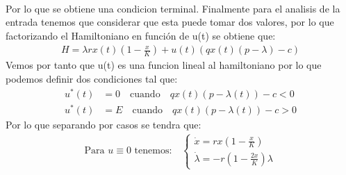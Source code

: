 \begin{itemize}
\begin{align}
\end{align}
Por lo que se obtiene una condicion terminal. Finalmente para el analisis de la entrada tenemos que considerar que esta puede tomar dos valores, por lo que factorizando el Hamiltoniano en función de u(t) se obtiene que:
\begin{align}
    H = \lambda r x(t) \left( 1 - \frac{x}{K} \right) + u(t) \left( q x(t) (p - \lambda) - c \right)
\end{align}
Vemos por tanto que u(t) es una funcion lineal al hamiltoniano por lo que podemos definir dos condiciones tal que:
\begin{align*}
    u^*(t) &= 0 \quad \text{cuando} \quad q x(t) (p - \lambda(t)) - c < 0 \\
    u^*(t) &= E \quad \text{cuando} \quad q x(t) (p - \lambda(t)) - c > 0
\end{align*}
Por lo que separando por casos se tendra que:
\begin{align}
    \text{Para } u \equiv 0 \text{ tenemos:} \quad
    \begin{cases}
        \dot{x} = r x \left(1 - \frac{x}{K}\right) \\
        \dot{\lambda} = -r \left(1 - \frac{2x}{K}\right) \lambda
    \end{cases}
\end{align}


\end{itemize}

